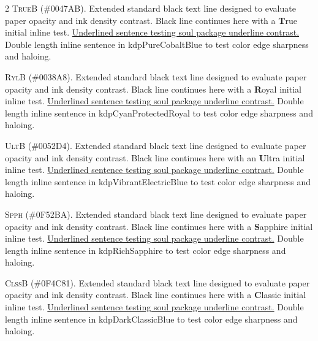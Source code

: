 \documentclass[9pt]{article}
\let\oldlettrine\lettrine
\renewcommand{\lettrine}[3][]{%
	\clubpenalty=10000
	\oldlettrine[#1]{#2}{#3}%
}
\begin{document}
\begin{multicols}{2}
\lettrine[lines=2]{\textcolor{kdpPureCobaltBlue}{T}}{rueB} (\#0047AB). Extended standard black text line designed to evaluate paper opacity and ink density contrast. Black line continues here with a \textbf{\textcolor{kdpPureCobaltBlue}{T}}rue initial inline test. \ul{Underlined sentence testing soul package underline contrast.} \textcolor{kdpPureCobaltBlue}{Double length inline sentence in kdpPureCobaltBlue to test color edge sharpness and haloing.}
\medskip

\lettrine[lines=2]{\textcolor{kdpCyanProtectedRoyal}{R}}{ylB} (\#0038A8). Extended standard black text line designed to evaluate paper opacity and ink density contrast. Black line continues here with a \textbf{\textcolor{kdpCyanProtectedRoyal}{R}}oyal initial inline test. \ul{Underlined sentence testing soul package underline contrast.} \textcolor{kdpCyanProtectedRoyal}{Double length inline sentence in kdpCyanProtectedRoyal to test color edge sharpness and haloing.}
\medskip

\lettrine[lines=2]{\textcolor{kdpVibrantElectricBlue}{U}}{ltB} (\#0052D4). Extended standard black text line designed to evaluate paper opacity and ink density contrast. Black line continues here with an \textbf{\textcolor{kdpVibrantElectricBlue}{U}}ltra initial inline test. \ul{Underlined sentence testing soul package underline contrast.} \textcolor{kdpVibrantElectricBlue}{Double length inline sentence in kdpVibrantElectricBlue to test color edge sharpness and haloing.}
\medskip

\lettrine[lines=2]{\textcolor{kdpRichSapphire}{S}}{pph} (\#0F52BA). Extended standard black text line designed to evaluate paper opacity and ink density contrast. Black line continues here with a \textbf{\textcolor{kdpRichSapphire}{S}}apphire initial inline test. \ul{Underlined sentence testing soul package underline contrast.} \textcolor{kdpRichSapphire}{Double length inline sentence in kdpRichSapphire to test color edge sharpness and haloing.}
\medskip

\lettrine[lines=2]{\textcolor{kdpDarkClassicBlue}{C}}{lssB} (\#0F4C81). Extended standard black text line designed to evaluate paper opacity and ink density contrast. Black line continues here with a \textbf{\textcolor{kdpDarkClassicBlue}{C}}lassic initial inline test. \ul{Underlined sentence testing soul package underline contrast.} \textcolor{kdpDarkClassicBlue}{Double length inline sentence in kdpDarkClassicBlue to test color edge sharpness and haloing.}
\medskip


\end{multicols}
\end{document}
